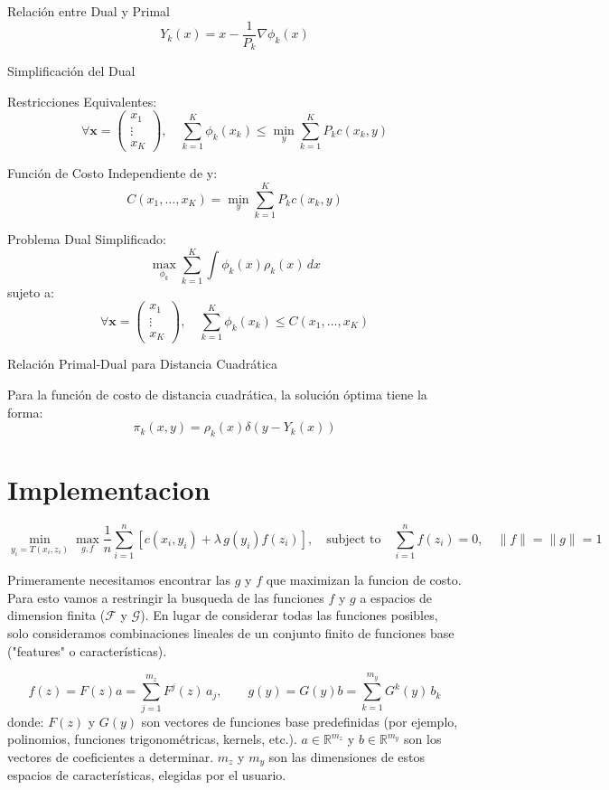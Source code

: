 \documentclass{myarticle}
\begin{document}
Relación entre Dual y Primal
\[Y_k(x) = x - \frac{1}{P_k} \nabla \phi_k(x) \]

Simplificación del Dual

Restricciones Equivalentes:
\[\forall \mathbf{x} = \begin{pmatrix} x_1 \\ \vdots \\ x_K \end{pmatrix}, \quad \sum_{k=1}^{K} \phi_k(x_k) \leq \min_y \sum_{k=1}^{K} P_k c(x_k, y) \]

Función de Costo Independiente de y:
\[C(x_1, \ldots, x_K) = \min_y \sum_{k=1}^{K} P_k c(x_k, y) \]

Problema Dual Simplificado:
\[\max_{\phi_k} \sum_{k=1}^{K} \int \phi_k(x) \rho_k(x) \, dx \]
sujeto a:
\[\forall \mathbf{x} = \begin{pmatrix} x_1 \\ \vdots \\ x_K \end{pmatrix}, \quad \sum_{k=1}^{K} \phi_k(x_k) \leq C(x_1, \ldots, x_K) \]

Relación Primal-Dual para Distancia Cuadrática

Para la función de costo de distancia cuadrática, la solución óptima tiene la forma:
\[\pi_k(x, y) = \rho_k(x) \delta(y - Y_k(x))\]

\section{Implementacion}

\[\min_{y_i = T(x_i, z_i)} \max_{g, f}  \frac{1}{n} \sum_{i=1}^{n} \left[ c(x_i, y_i) + \lambda \, g(y_i) f(z_i) \right], \quad \text{subject to} \quad \sum_{i=1}^{n} f(z_i) = 0, \quad \|f\| = \|g\| = 1 \]

Primeramente necesitamos encontrar las $g$ y $f$ que maximizan la funcion de costo. Para esto vamos a restringir la busqueda  de las funciones \(f\) y \(g\)  a  espacios de dimension finita (\(\mathcal{F}\) y \(\mathcal{G}\)). En lugar de considerar todas las funciones posibles, solo consideramos combinaciones lineales de un conjunto finito de funciones base ("features" o características).

\[
f(z) = F(z)a = \sum_{j=1}^{m_z} F^j(z) \, a_j, \quad \quad g(y) = G(y)b = \sum_{k=1}^{m_y} G^k(y) \, b_k
\]
donde:
   \(F(z)\) y \(G(y)\) son vectores de funciones base predefinidas (por ejemplo, polinomios, funciones trigonométricas, kernels, etc.).
   \(a \in \mathbb{R}^{m_z}\) y \(b \in \mathbb{R}^{m_y}\) son los vectores de coeficientes a determinar.
   \(m_z\) y \(m_y\) son las dimensiones de estos espacios de características, elegidas por el usuario.
\end{document}

